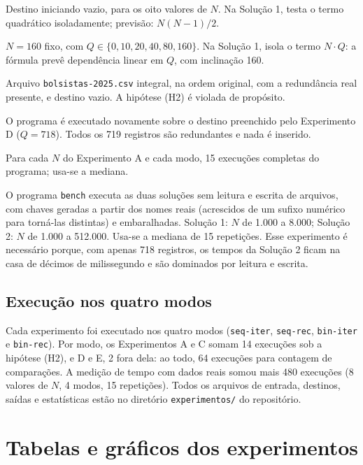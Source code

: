 \documentclass[11pt,a4paper]{article}
\begin{document}
\begin{description}[leftmargin=1cm,style=nextline,itemsep=2pt]
  \item[Experimento A ($Q=0$)] Destino iniciando vazio, para os oito valores de $N$. Na Solução 1, testa o termo quadrático isoladamente; previsão: $N(N-1)/2$.
  \item[Experimento C ($Q$ variável)] $N=160$ fixo, com $Q\in\{0,10,20,40,80,160\}$. Na Solução 1, isola o termo $N\cdot Q$: a fórmula prevê dependência linear em $Q$, com inclinação 160.
  \item[Experimento D (arquivo completo)] Arquivo \texttt{bolsistas-2025.csv} integral, na ordem original, com a redundância real presente, e destino vazio. A hipótese (H2) é violada de propósito.
  \item[Experimento E (reexecução)] O programa é executado novamente sobre o destino preenchido pelo Experimento D ($Q=718$). Todos os 719 registros são redundantes e nada é inserido.
  \item[Tempos com dados reais] Para cada $N$ do Experimento A e cada modo, 15 execuções completas do programa; usa-se a mediana.
  \item[Benchmark em memória] O programa \texttt{bench} executa as duas soluções sem leitura e escrita de arquivos, com chaves geradas a partir dos nomes reais (acrescidos de um sufixo numérico para torná-las distintas) e embaralhadas. Solução 1: $N$ de 1.000 a 8.000; Solução 2: $N$ de 1.000 a 512.000. Usa-se a mediana de 15 repetições. Esse experimento é necessário porque, com apenas 718 registros, os tempos da Solução 2 ficam na casa de décimos de milissegundo e são dominados por leitura e escrita.
\end{description}

\subsection{Execução nos quatro modos}

Cada experimento foi executado nos quatro modos (\texttt{seq-iter}, \texttt{seq-rec}, \texttt{bin-iter} e \texttt{bin-rec}). Por modo, os Experimentos A e C somam 14 execuções sob a hipótese (H2), e D e E, 2 fora dela: ao todo, 64 execuções para contagem de comparações. A medição de tempo com dados reais somou mais 480 execuções (8 valores de $N$, 4 modos, 15 repetições). Todos os arquivos de entrada, destinos, saídas e estatísticas estão no diretório \texttt{experimentos/} do repositório.

\section{Tabelas e gráficos dos experimentos}
\end{document}
